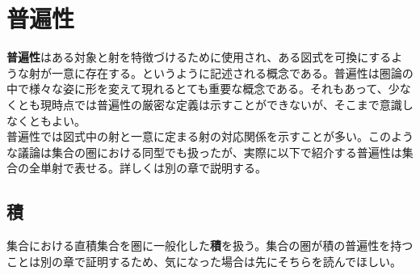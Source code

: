 \documentclass[uplatex,dvipdfmx]{jsarticle}
\numberwithin{proof}{subsection}
\begin{document}
	\section{普遍性}
	\textbf{普遍性}はある対象と射を特徴づけるために使用され、ある図式を可換にするような射が一意に存在する。というように記述される概念である。普遍性は圏論の中で様々な姿に形を変えて現れるとても重要な概念である。それもあって、少なくとも現時点では普遍性の厳密な定義は示すことができないが、そこまで意識しなくともよい。\\
  普遍性では図式中の射と一意に定まる射の対応関係を示すことが多い。このような議論は集合の圏における同型でも扱ったが、実際に以下で紹介する普遍性は集合の全単射で表せる。詳しくは別の章で説明する。\\
	\subsection{積}
  集合における直積集合を圏に一般化した\textbf{積}を扱う。集合の圏が積の普遍性を持つことは別の章で証明するため、気になった場合は先にそちらを読んでほしい。
\end{document}
